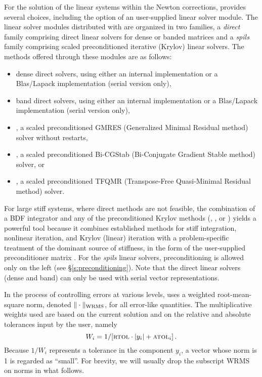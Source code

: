 For the solution of the linear systems within the Newton corrections, 
{\idas} provides several choices, including the option of an user-supplied
linear solver module. The linear solver modules distributed with {\sundials}
are organized in two families, a {\em direct} family comprising direct linear 
solvers for dense or banded matrices and a {\em spils} family comprising
scaled preconditioned iterative (Krylov) linear solvers. 
The methods offered through these modules are as follows:
\begin{itemize}
\item dense direct solvers, using either an internal implementation or 
  a Blas/Lapack implementation (serial version only),
\item band direct solvers, using either an internal implementation or 
  a Blas/Lapack implementation (serial version only),
\item {\spgmr}, a scaled preconditioned GMRES (Generalized Minimal Residual method)
  solver without restarts,
\item {\spbcg}, a scaled preconditioned Bi-CGStab (Bi-Conjugate Gradient Stable
  method) solver, or
\item {\sptfqmr}, a scaled preconditioned TFQMR (Transpose-Free Quasi-Minimal
  Residual method) solver.
\end{itemize}
For large stiff systems, where direct methods are not feasible, the
combination of a BDF integrator and any of the preconditioned Krylov
methods ({\spgmr}, {\spbcg}, or {\sptfqmr}) yields a powerful tool
because it combines established methods for stiff integration,
nonlinear iteration, and Krylov (linear) iteration with a
problem-specific treatment of the dominant source of stiffness, in the
form of the user-supplied preconditioner matrix \cite{BrHi:89}. 
For the {\em spils} linear solvers,  preconditioning is allowed
only on the left (see \S\ref{s:preconditioning}).
Note that the direct linear solvers (dense and band) can only be 
used with serial vector representations.

In the process of controlling errors at various levels, {\idas} uses a
weighted root-mean-square norm, denoted $\|\cdot\|_{\mbox{\scriptsize WRMS}}$,
for all error-like quantities.  The multiplicative weights used are based on
the current solution and on the relative and absolute tolerances input by the
user, namely
\begin{equation}\label{e:errwt}
 W_i = 1 / [ \mbox{\sc rtol} \cdot |y_i| + \mbox{\sc atol}_i ] \, .
\end{equation}
Because $1/W_i$ represents a tolerance in the component $y_i$, a vector
whose norm is 1 is regarded as ``small''.  For brevity, we will
usually drop the subscript WRMS on norms in what follows.

